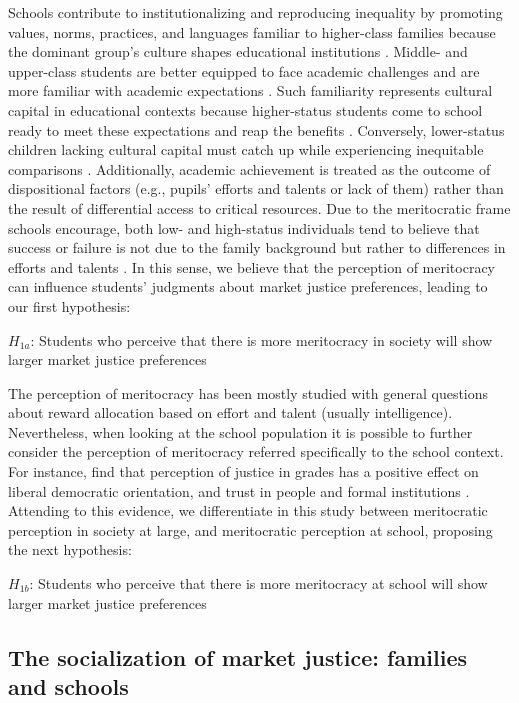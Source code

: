 \documentclass[
    behavsci,
    article,
    submit,
moreauthors
]{mdpi}
\begin{document}
Schools contribute to institutionalizing and reproducing inequality by
promoting values, norms, practices, and languages familiar to
higher-class families because the dominant group's culture shapes
educational institutions \citep{bourdieu_reproduction_1990}. Middle- and
upper-class students are better equipped to face academic challenges and
are more familiar with academic expectations
\citep{mikus_children_2019}. Such familiarity represents cultural
capital in educational contexts because higher-status students come to
school ready to meet these expectations and reap the benefits
\citep{jack_no_2016, khan_privilege_2011}. Conversely, lower-status
children lacking cultural capital must catch up while experiencing
inequitable comparisons \citep{goudeau_hidden_2017}. Additionally,
academic achievement is treated as the outcome of dispositional factors
(e.g., pupils' efforts and talents or lack of them) rather than the
result of differential access to critical resources. Due to the
meritocratic frame schools encourage, both low- and high-status
individuals tend to believe that success or failure is not due to the
family background but rather to differences in efforts and talents
\citep{darnon_where_2018}. In this sense, we believe that the perception
of meritocracy can influence students' judgments about market justice
preferences, leading to our first hypothesis:

\(H_{1a}\): Students who perceive that there is more meritocracy in
society will show larger market justice preferences

The perception of meritocracy has been mostly studied with general
questions about reward allocation based on effort and talent (usually
intelligence). Nevertheless, when looking at the school population it is
possible to further consider the perception of meritocracy referred
specifically to the school context. For instance,
\citet{resh_sense_2010} find that perception of justice in grades has a
positive effect on liberal democratic orientation, and trust in people
and formal institutions \citep{resh_sense_2014}. Attending to this
evidence, we differentiate in this study between meritocratic perception
in society at large, and meritocratic perception at school, proposing
the next hypothesis:

\(H_{1b}\): Students who perceive that there is more meritocracy at
school will show larger market justice preferences

\subsection{The socialization of market justice: families and
schools}\label{the-socialization-of-market-justice-families-and-schools}
\end{document}
